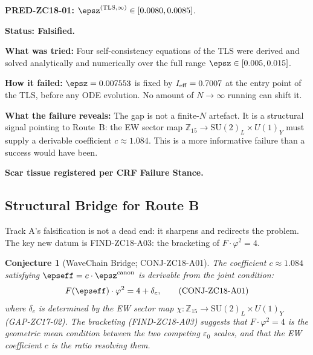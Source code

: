 \documentclass[12pt, a4paper]{article}
\newtheorem{conjecture}{Conjecture}[section]
\begin{document}
\begin{formalbox}[title={Phase Misalignment PM-ZC18-A01 (Registered with Pride)}]
\textbf{PRED-ZC18-01:} $\epsz^{(\mathrm{TLS},\infty)}\in[0.0080,0.0085]$.

\textbf{Status: Falsified.}

\textbf{What was tried:} Four self-consistency equations of the TLS
were derived and solved analytically and numerically over the full
range $\epsz\in[0.005, 0.015]$.

\textbf{How it failed:} $\epsz = 0.007553$ is fixed by
$I_{\rm eff}=0.7007$ at the entry point of the TLS, before any
ODE evolution. No amount of $N\to\infty$ running can shift it.

\textbf{What the failure reveals:}
The gap is not a finite-$N$ artefact.
It is a structural signal pointing to Route~B:
the EW sector map $\mathbb{Z}_{15}\to\mathrm{SU}(2)_L\times U(1)_Y$
must supply a derivable coefficient $c\approx 1.084$.
This is a more informative failure than a success would have been.

\textbf{Scar tissue registered per CRF Failure Stance.}
\end{formalbox}

\subsection{Structural Bridge for Route B}
\label{zc18a:sec:bridge}

Track A's falsification is not a dead end: it sharpens and
redirects the problem.
The key new datum is FIND-ZC18-A03: the bracketing of $F\cdot\varphi^2=4$.

\begin{conjecture}[WaveChain Bridge; CONJ-ZC18-A01]
\label{zc18a:conj:wavechain}
The coefficient $c\approx 1.084$ satisfying $\epseff = c\cdot\epsz^{\rm canon}$
is derivable from the joint condition:
\begin{equation}
  F(\epseff)\cdot\varphi^2 = 4 + \delta_c,
  \tag{CONJ-ZC18-A01}
\end{equation}
where $\delta_c$ is determined by the EW sector map
$\chi: \mathbb{Z}_{15}\to\mathrm{SU}(2)_L\times U(1)_Y$
(GAP-ZC17-02).
The bracketing (FIND-ZC18-A03) suggests that $F\cdot\varphi^2=4$ is
the geometric mean condition between the two competing $\varepsilon_0$
scales, and that the EW coefficient $c$ is the ratio resolving them.
\end{conjecture}
\end{document}
